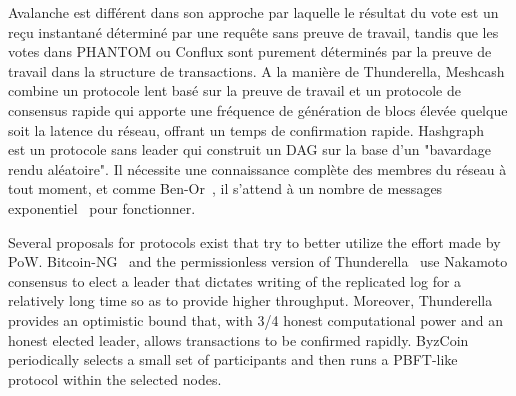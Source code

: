 {Avalanche est différent dans son approche par laquelle le résultat du vote est un reçu instantané déterminé par une
requête sans preuve de travail, tandis que les votes dans PHANTOM ou Conflux sont purement déterminés par la preuve de
travail dans la structure de transactions. A la manière de Thunderella, Meshcash~\cite{BentovHMN17} combine un protocole
lent basé sur la preuve de travail et un protocole de consensus rapide qui apporte une fréquence de génération de blocs
élevée quelque soit la latence du réseau, offrant un temps de confirmation rapide. Hashgraph~\cite{baird2016hashgraph}
est un protocole sans leader qui construit un DAG sur la base d'un "bavardage rendu aléatoire". Il nécessite une
connaissance complète des membres du réseau à tout moment, et comme Ben-Or~\cite{ben1983another}, il s'attend à un
nombre de messages exponentiel~\cite{aspnes2003randomized,CachinV17} pour fonctionner.

}{
Several proposals for protocols exist that try to
better utilize the effort made by PoW.
Bitcoin-NG~\cite{EyalGSR16} and the permissionless version of
Thunderella~\cite{PassS18} use Nakamoto consensus to elect a leader that
dictates writing of the replicated log for a relatively long time so as to
provide higher throughput. Moreover, Thunderella provides an
optimistic bound that, with 3/4 honest computational power and an honest
elected leader, allows transactions to be confirmed rapidly.
ByzCoin~\cite{Kokoris-KogiasJ16} periodically selects a small set of
participants and then runs a PBFT-like protocol within the selected nodes. 

}
